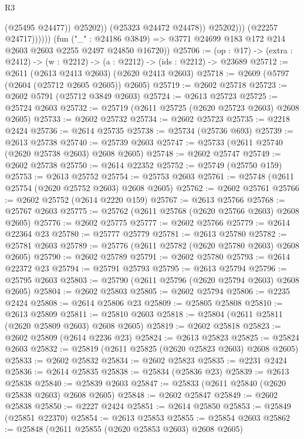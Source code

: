 \begin{lexlean}{R3}
\begin{coremodule}
                              (@25495 @24477))
                            @25202))
                        (@25323 @24472 @24478))
                      @25202)))
                (@22257 @24717))))))
      (fun ("_" : @24186 @3849) =>
      @3771 @24699 @183 @172 @214 @2603 @2603 @2255 @2497 @24850 @16720))
@25706 := (op : @17) -> (extra : @2412) -> (w : @2212) -> (a : @2212) -> (ids : @2212) -> @23689
@25712 := @2611 (@2613 @2413 @2603) (@2620 @2413 @2603)
@25718 := @2609 (@5797 (@2604 (@25712 @2605 @2605)) @2605)
@25719 := @2602 @25718
@25723 := @2602 @5791 (@25712 @3849 @2603)
@25724 := @2613 @25723
@25725 := @25724 @2603
@25732 := @25719 (@2611 @25725 (@2620 @25723 @2603) @2608 @2605)
@25733 := @2602 @25732
@25734 := @2602 @25723
@25735 := @2218 @2424
@25736 := @2614 @25735
@25738 := @25734 (@25736 @693)
@25739 := @2613 @25738
@25740 := @25739 @2603
@25747 := @25733 (@2611 @25740 (@2620 @25738 @2603) @2608 @2605)
@25748 := @2602 @25747
@25749 := @2602 @25738
@25750 := @2614 @22352
@25752 := @25749 (@25750 @159)
@25753 := @2613 @25752
@25754 := @25753 @2603
@25761 := @25748 (@2611 @25754 (@2620 @25752 @2603) @2608 @2605)
@25762 := @2602 @25761
@25766 := @2602 @25752 (@2614 @2220 @159)
@25767 := @2613 @25766
@25768 := @25767 @2603
@25775 := @25762 (@2611 @25768 (@2620 @25766 @2603) @2608 @2605)
@25776 := @2602 @25775
@25777 := @2602 @25766
@25779 := @2614 @22364 @23
@25780 := @25777 @25779
@25781 := @2613 @25780
@25782 := @25781 @2603
@25789 := @25776 (@2611 @25782 (@2620 @25780 @2603) @2608 @2605)
@25790 := @2602 @25789
@25791 := @2602 @25780
@25793 := @2614 @22372 @23
@25794 := @25791 @25793
@25795 := @2613 @25794
@25796 := @25795 @2603
@25803 := @25790 (@2611 @25796 (@2620 @25794 @2603) @2608 @2605)
@25804 := @2602 @25803
@25805 := @2602 @25794
@25806 := @2235 @2424
@25808 := @2614 @25806 @23
@25809 := @25805 @25808
@25810 := @2613 @25809
@25811 := @25810 @2603
@25818 := @25804 (@2611 @25811 (@2620 @25809 @2603) @2608 @2605)
@25819 := @2602 @25818
@25823 := @2602 @25809 (@2614 @2236 @23)
@25824 := @2613 @25823
@25825 := @25824 @2603
@25832 := @25819 (@2611 @25825 (@2620 @25823 @2603) @2608 @2605)
@25833 := @2602 @25832
@25834 := @2602 @25823
@25835 := @2231 @2424
@25836 := @2614 @25835
@25838 := @25834 (@25836 @23)
@25839 := @2613 @25838
@25840 := @25839 @2603
@25847 := @25833 (@2611 @25840 (@2620 @25838 @2603) @2608 @2605)
@25848 := @2602 @25847
@25849 := @2602 @25838
@25850 := @2227 @2424
@25851 := @2614 @25850
@25853 := @25849 (@25851 @22370)
@25854 := @2613 @25853
@25855 := @25854 @2603
@25862 := @25848 (@2611 @25855 (@2620 @25853 @2603) @2608 @2605)

\end{coremodule}
\end{lexlean}
